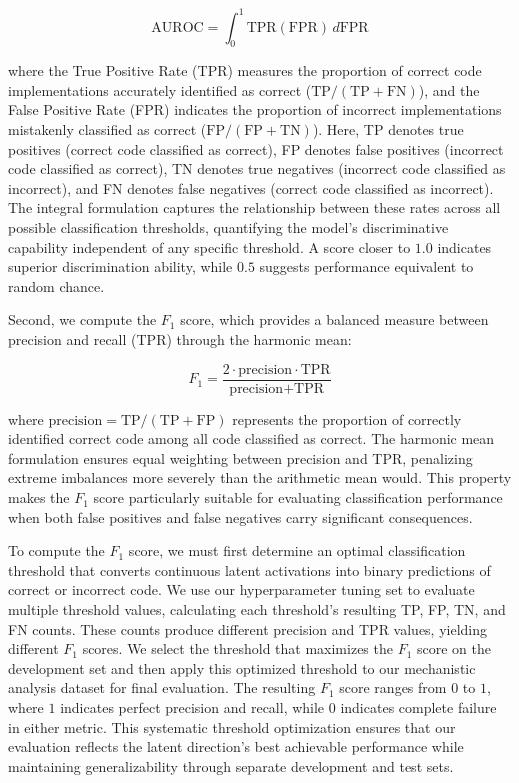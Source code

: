 \begin{equation}
\text{AUROC} = \int_0^1 \text{TPR}(\text{FPR})\,d\text{FPR}
\end{equation}

where the True Positive Rate (TPR) measures the proportion of correct code implementations accurately identified as correct ($\text{TP}/(\text{TP} + \text{FN})$), and the False Positive Rate (FPR) indicates the proportion of incorrect implementations mistakenly classified as correct ($\text{FP}/(\text{FP} + \text{TN})$). Here, TP denotes true positives (correct code classified as correct), FP denotes false positives (incorrect code classified as correct), TN denotes true negatives (incorrect code classified as incorrect), and FN denotes false negatives (correct code classified as incorrect). The integral formulation captures the relationship between these rates across all possible classification thresholds, quantifying the model's discriminative capability independent of any specific threshold. A score closer to $1.0$ indicates superior discrimination ability, while $0.5$ suggests performance equivalent to random chance.


Second, we compute the $F_1$ score, which provides a balanced measure between precision and recall (TPR) through the harmonic mean:

\begin{equation}
F_1 = \frac{2 \cdot \text{precision} \cdot \text{TPR}}{\text{precision} + \text{TPR}}
\end{equation}

where $\text{precision} = \text{TP}/(\text{TP} + \text{FP})$ represents the proportion of correctly identified correct code among all code classified as correct. The harmonic mean formulation ensures equal weighting between precision and TPR, penalizing extreme imbalances more severely than the arithmetic mean would. This property makes the $F_1$ score particularly suitable for evaluating classification performance when both false positives and false negatives carry significant consequences.

To compute the $F_1$ score, we must first determine an optimal classification threshold that converts continuous latent activations into binary predictions of correct or incorrect code. We use our hyperparameter tuning set to evaluate multiple threshold values, calculating each threshold's resulting TP, FP, TN, and FN counts. These counts produce different precision and TPR values, yielding different $F_1$ scores. We select the threshold that maximizes the $F_1$ score on the development set and then apply this optimized threshold to our mechanistic analysis dataset for final evaluation. The resulting $F_1$ score ranges from $0$ to $1$, where $1$ indicates perfect precision and recall, while $0$ indicates complete failure in either metric. This systematic threshold optimization ensures that our evaluation reflects the latent direction's best achievable performance while maintaining generalizability through separate development and test sets.


